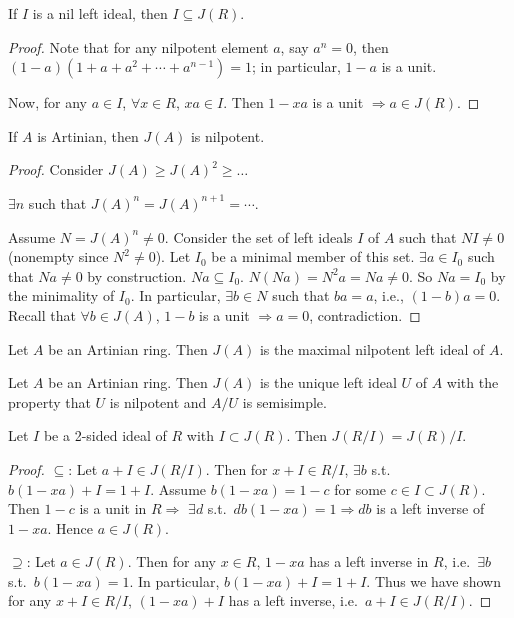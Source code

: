 \documentclass[11pt, a4paper]{report}
\begin{document}
\begin{theorem}
If $I$ is a nil left ideal, then $I \subseteq J(R)$.
\end{theorem}

\begin{proof}
Note that for any nilpotent element $a$, say $a^{n} = 0$, then $(1 - a)(1 + a + a^{2} + \cdots + a^{n-1}) = 1$; in particular, $1 - a$ is a unit.

Now, for any $a \in I$, $\forall x \in R$, $xa \in I$. Then $1 - xa$ is a unit $\Rightarrow a \in J(R)$.
\end{proof}

\begin{theorem}
If $A$ is Artinian, then $J(A)$ is nilpotent.
\end{theorem}

\begin{proof}
Consider $J(A) \geq J(A)^{2} \geq \ldots$

$\exists n$ such that $J(A)^{n} = J(A)^{n+1} = \cdots$.

Assume $N = J(A)^{n} \neq 0$. Consider the set of left ideals $I$ of $A$ such that $NI \neq 0$ (nonempty since $N^{2} \neq 0$). Let $I_{0}$ be a minimal member of this set. $\exists a \in I_{0}$ such that $Na \neq 0$ by construction. $Na \subseteq I_{0}$. $N(Na) = N^{2}a = Na \neq 0$. So $Na = I_{0}$ by the minimality of $I_{0}$. In particular, $\exists b \in N$ such that $ba = a$, i.e., $(1 - b)a = 0$. Recall that $\forall b \in J(A)$, $1 - b$ is a unit $\Rightarrow a = 0$, contradiction.
\end{proof}

\begin{corollary}
Let $A$ be an Artinian ring. Then $J(A)$ is the maximal nilpotent left ideal of $A$.
\end{corollary}

\begin{corollary}
Let $A$ be an Artinian ring. Then $J(A)$ is the unique left ideal $U$ of $A$ with the property that $U$ is nilpotent and $A/U$ is semisimple.
\end{corollary}

\begin{theorem}
Let $I$ be a 2-sided ideal of $R$ with $I \subset J(R)$. Then $J(R/I)=J(R)/I$.
\end{theorem}

\begin{proof}
$\subseteq$: Let $a+I \in J(R/I)$. Then for $x+I \in R/I$, $\exists b$ s.t.\ $b(1-xa)+I=1+I$. Assume $b(1-xa)=1-c$ for some $c \in I \subset J(R)$. Then $1-c$ is a unit in $R \Rightarrow$ $\exists d$ s.t.\ $db(1-xa)=1 \Rightarrow db$ is a left inverse of $1-xa$. Hence $a \in J(R)$.

$\supseteq$: Let $a \in J(R)$. Then for any $x \in R$, $1-xa$ has a left inverse in $R$, i.e.\ $\exists b$ s.t.\ $b(1-xa)=1$. In particular, $b(1-xa)+I=1+I$. Thus we have shown for any $x+I \in R/I$, $(1-xa)+I$ has a left inverse, i.e.\ $a+I \in J(R/I)$.
\end{proof}
\end{document}
